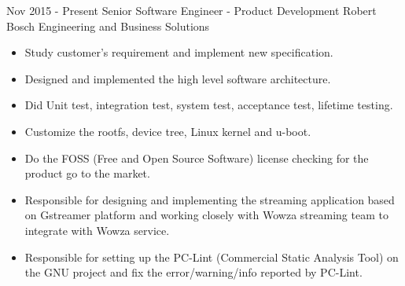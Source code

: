 \documentclass[letterpaper]{twentysecondcv} %
\begin{document}
\begin{twenty} %
	\twentyitem
		{Nov 2015 -}
		{Present}
		{Senior Software Engineer - Product Development}
	    {Robert Bosch Engineering and Business Solutions}
	    {}
	    {\begin{itemize}
	    \item Study customer’s requirement and implement new specification.
	    \item Designed and implemented the high level software architecture.
	    \item Did Unit test, integration test, system test, acceptance test, lifetime testing.
	    \item Customize the rootfs, device tree, Linux kernel and u-boot.
	    \item Do the FOSS (Free and Open Source Software) license checking for the product go to the
	    market.
	    \item Responsible for designing and implementing the streaming application based on Gstreamer
	    platform and working closely with Wowza streaming team to integrate with Wowza service.
	    \item Responsible for setting up the PC-Lint (Commercial Static Analysis Tool) on the GNU project and fix the error/warning/info reported by PC-Lint.
	    \end{itemize}}
    \\
    

\end{twenty}
\end{document}
